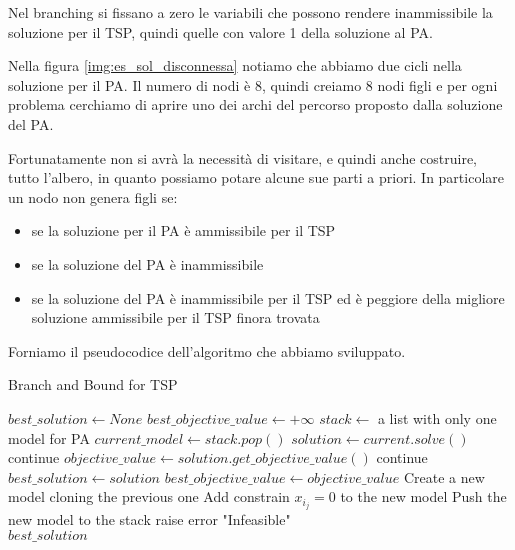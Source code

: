 Nel branching si fissano a zero le variabili che possono rendere inammissibile la soluzione per il TSP, quindi quelle con valore 1 della soluzione al PA.

Nella figura \ref{img:es_sol_disconnessa} notiamo che abbiamo due cicli nella soluzione per il PA. Il numero di nodi è 8, quindi creiamo 8 nodi figli e per ogni problema cerchiamo di aprire uno dei archi del percorso proposto dalla soluzione del PA.

Fortunatamente non si avrà la necessità di visitare, e quindi anche costruire, tutto l'albero, in quanto possiamo potare alcune sue parti a priori. In particolare un nodo non genera figli se:

\begin{itemize}
    \item se la soluzione per il PA è ammissibile per il TSP
    \item se la soluzione del PA è inammissibile
    \item se la soluzione del PA è inammissibile per il TSP ed è peggiore della migliore soluzione ammissibile per il TSP finora trovata
\end{itemize}

\newpage
Forniamo il pseudocodice dell'algoritmo che abbiamo sviluppato.

\begin{algorithm}
\caption{Branch and Bound for TSP}\label{alg:brand:and_bound_pseudocode}
\begin{algorithmic}
\State $best\_solution \gets None$
\State $best\_objective\_value \gets +\infty$
\State $stack \gets$ a list with only one model for PA
    \State $current\_model \gets stack.pop()$
    \State $solution \gets current.solve()$
        continue  
    \EndIf
    \State $objective\_value \gets solution.get\_objective\_value()$
        continue  
    \EndIf
        \State $best\_solution \gets solution$
        \State $best\_objective\_value \gets objective\_value$
    \EndIf
            \State Create a new model cloning the previous one
            \State Add constrain $x_{i_j} = 0$ to the new model
            \State Push the new model to the stack
        \EndIf
    \EndFor
\EndWhile
{}
        \State raise error "Infeasible"
\EndIf \\
\Return$best\_solution$
\end{algorithmic}
\end{algorithm}

